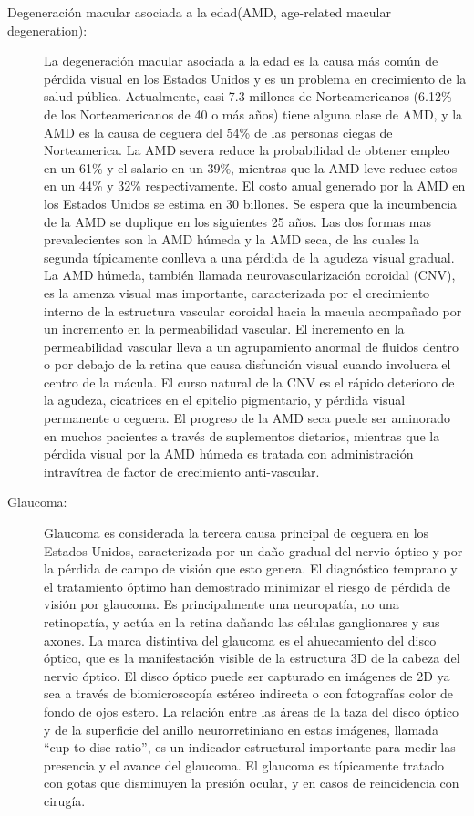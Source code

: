 \begin{description}
    \item[Degeneración macular asociada a la edad(AMD, age-related macular degeneration):]La degeneración macular asociada a la edad es la causa más común de pérdida visual en los Estados Unidos y es un problema en crecimiento de la salud pública. Actualmente, casi 7.3 millones de Norteamericanos (6.12\% de los Norteamericanos de 40 o más años) tiene alguna clase de AMD, y la AMD es la causa de ceguera del 54\% de las personas ciegas de Norteamerica. La AMD severa reduce la probabilidad de obtener empleo en un 61\% y el salario en un 39\%, mientras que la AMD leve reduce estos en un 44\% y 32\% respectivamente. El costo anual generado por la AMD en los Estados Unidos se estima en 30 billones. Se espera que la incumbencia de la AMD se duplique en los siguientes 25 años. Las dos formas mas prevalecientes son la AMD húmeda y la AMD seca, de las cuales la segunda típicamente conlleva a una pérdida de la agudeza visual gradual. La AMD húmeda, también llamada neurovascularización coroidal (CNV), es la amenza visual mas importante, caracterizada por el crecimiento interno de la estructura vascular coroidal hacia la macula acompañado por un incremento en la permeabilidad vascular. El incremento en la permeabilidad vascular lleva a un agrupamiento anormal de fluidos dentro o por debajo de la retina que causa disfunción visual cuando involucra el centro de la mácula. El curso natural de la CNV es el rápido deterioro de la agudeza, cicatrices en el epitelio pigmentario, y pérdida visual permanente o ceguera. El progreso de la AMD seca puede ser aminorado en muchos pacientes a través de suplementos dietarios, mientras que la pérdida visual por la AMD húmeda es tratada con administración intravítrea de factor de crecimiento anti-vascular.
     \item[Glaucoma:] Glaucoma es considerada la tercera causa principal de ceguera en los Estados Unidos, caracterizada por un daño gradual del nervio óptico y por la pérdida de campo de visión que esto genera. El diagnóstico temprano y el tratamiento óptimo han demostrado minimizar el riesgo de pérdida de visión por glaucoma. Es principalmente una neuropatía, no una retinopatía, y actúa en la retina dañando las células ganglionares y sus axones. La marca distintiva del glaucoma es el ahuecamiento del disco óptico, que es la manifestación visible de la estructura 3D de la cabeza del nervio óptico. El disco óptico puede ser capturado en imágenes de 2D ya sea a través de biomicroscopía estéreo indirecta o con fotografías color de fondo de ojos estero. La relación entre las áreas de la taza del disco óptico y de la superficie del anillo neurorretiniano en estas imágenes, llamada “cup-to-disc ratio”, es un indicador estructural importante para medir las presencia y el avance del glaucoma. El glaucoma es típicamente tratado con gotas que disminuyen la presión ocular, y en casos de reincidencia con cirugía.

\end{description}
